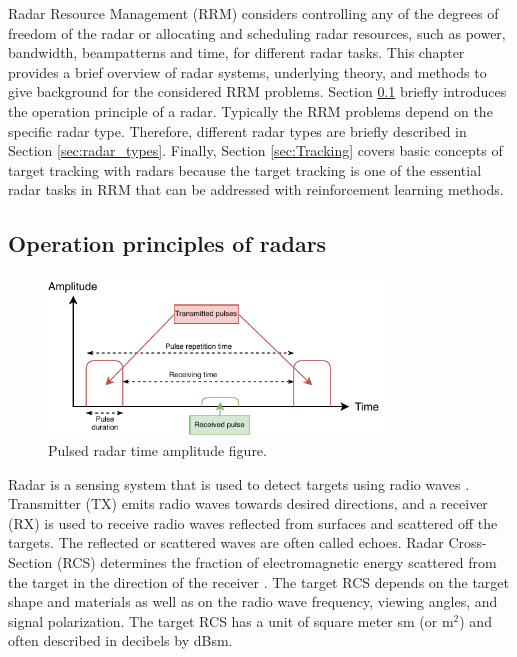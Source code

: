\documentclass[english, 12pt, a4paper, elec, utf8, a-1b, online]{aaltothesis}
\numberwithin{equation}{section}
\begin{document}
Radar Resource Management (RRM) considers controlling any of the degrees of freedom of the radar or allocating and scheduling radar resources, such as power, bandwidth, beampatterns and time, for different radar tasks.
This chapter provides a brief overview of radar systems, underlying theory, and methods to give background for the considered RRM problems.
Section \ref{sec:radar_opertaion_principle} briefly introduces the operation principle of a radar.
Typically the RRM problems depend on the specific radar type. 
Therefore, different radar types are briefly described in Section \ref{sec:radar_types}. 
Finally, Section \ref{sec:Tracking} covers basic concepts of target tracking with radars because the target tracking is one of the essential radar tasks in RRM that can be addressed with reinforcement learning methods.

\subsection{Operation principles of radars} \label{sec:radar_opertaion_principle}

\begin{figure}[htb]
    \centering
    \includegraphics[width=0.8\textwidth]{figures/background/pulsed_radar.pdf}
    \caption{Pulsed radar time amplitude figure.}
    \label{fig:pulsed_radar}
\end{figure}

Radar is a sensing system that is used to detect targets using radio waves \cite{Curry2011}.
Transmitter (TX) emits radio waves towards desired directions, and a receiver (RX) is used to receive radio waves reflected from surfaces and scattered off the targets. 
The reflected or scattered waves are often called echoes.
Radar Cross-Section (RCS) determines the fraction of electromagnetic energy scattered from the target in the direction of the receiver \cite{Curry2011}.
The target RCS depends on the target shape and materials as well as on the radio wave frequency, viewing angles, and signal polarization.
The target RCS has a unit of square meter sm (or m$^2$) and often described in decibels by dBsm.
\end{document}
